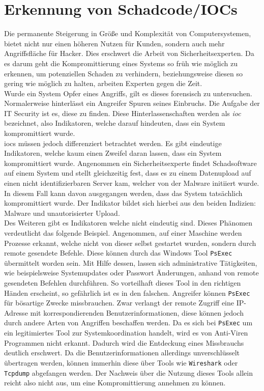 \documentclass[
    12pt, %
    DIV10,
    ngerman, %
    a4paper, %
    oneside, %
    titlepage, %
    parskip=half, %
    headings=normal, %
    listof=totoc, %
    bibliography=totoc, %
    index=totoc, %
    captions=tableheading, %
    final %
]{scrreprt}
\begin{document}
\chapter{Erkennung von Schadcode/IOCs}\label{sec:ioc}
Die permanente Steigerung in Grö{\ss}e und Komplexität von Computersystemen, bietet nicht nur einen höheren Nutzen für Kunden, sondern auch mehr Angriffsfläche für Hacker. Dies erschwert die Arbeit von Sicherheitsexperten. Da es darum geht die Kompromittierung eines Systems so früh wie möglich zu erkennen, um potenziellen Schaden zu verhindern, beziehungsweise diesen so gering wie möglich zu halten, arbeiten Experten gegen die Zeit.\\
Wurde ein System Opfer eines Angriffs, gilt es dieses forensisch zu untersuchen. Normalerweise hinterlässt ein Angreifer Spuren seines Einbruchs. Die Aufgabe der IT Security ist es, diese zu finden. Diese Hinterlassenschaften werden als \emph{\acf{ioc}} bezeichnet, also Indikatoren, welche darauf hindeuten, dass ein System kompromittiert wurde.\\
%
\ac{iocs} müssen jedoch differenziert betrachtet werden. Es gibt eindeutige Indikatoren, welche kaum einen Zweifel daran lassen, dass ein System kompromittiert wurde. Angenommen ein Sicherheitsexperte findet Schadsoftware auf einem System und stellt gleichzeitig fest, dass es zu einem Datenupload auf einen nicht identifizierbaren Server kam, welcher von der Malware initiiert wurde. In diesem Fall kann davon ausgegangen werden, dass das System tatsächlich kompromittiert wurde. Der Indikator bildet sich hierbei aus den beiden Indizien: Malware und unautorisierter Upload.\\
Des Weiteren gibt es Indikatoren welche nicht eindeutig sind. Dieses Phänomen verdeutlicht das folgende Beispiel. Angenommen, auf einer Maschine werden Prozesse erkannt, welche nicht von dieser selbst gestartet wurden, sondern durch remote gesendete Befehle. Diese können durch das Windows Tool \texttt{PsExec} übermittelt worden sein. Mit Hilfe dessen, lassen sich administrative Tätigkeiten, wie beispielsweise Systemupdates oder Passwort Änderungen, anhand von remote gesendeten Befehlen durchführen. So vorteilhaft dieses Tool in den richtigen Händen erscheint, so gefährlich ist es in den falschen. Angreifer können \texttt{PsExec} für bösartige Zwecke missbrauchen. Zwar verlangt der remote Zugriff eine IP-Adresse mit korrespondierenden Benutzerinformationen, diese können jedoch durch andere Arten von Angriffen beschaffen werden. Da es sich bei \texttt{PsExec} um ein legitimiertes Tool zur Systemkoordination handelt, wird es von Anti-Viren Programmen nicht erkannt. Dadurch wird die Entdeckung eines Missbrauchs deutlich erschwert. Da die Benutzerinformationen allerdings unverschlüsselt übertragen werden, können immerhin diese über Tools wie \texttt{Wireshark} oder \texttt{Tcpdump} abgefangen werden. Der Nachweis über die Nutzung dieses Tools allein reicht also nicht aus, um eine Kompromittierung annehmen zu können.
\end{document}
